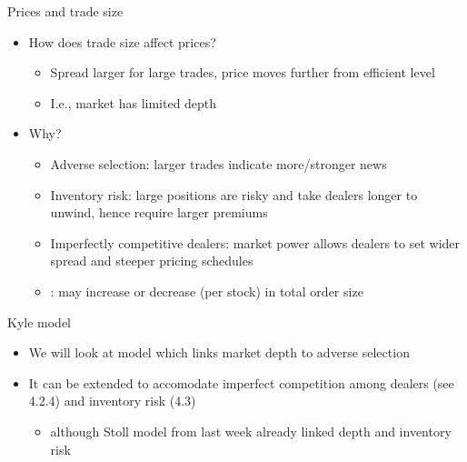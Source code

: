 \documentclass[english,10pt,aspectratio=169]{beamer}
\begin{document}
\begin{frame}{Prices and trade size}
	\begin{itemize}
		\item How does trade size affect prices? 
		\begin{itemize}
			\item Spread larger for large trades, price moves further from efficient level
			\item I.e., market has limited depth
		\end{itemize}
		\item Why?
		\pause
		\begin{itemize}
			\item \alert{Adverse selection}: larger trades indicate more/stronger news
			\item \alert{Inventory risk}: large positions are risky and take dealers longer to unwind, hence require larger premiums
			\item \alert{Imperfectly competitive dealers}: market power allows dealers to set wider spread and steeper pricing schedules
			\pause
			\item {}: may increase or decrease (per stock) in total order size
		\end{itemize}
	\end{itemize}
\end{frame}


\begin{frame}{Kyle model}
	\begin{itemize}
		\item We will look at \cite{kyle_continuous_1985} model which links market depth to adverse selection
		\item It can be extended to accomodate imperfect competition among dealers (see 4.2.4) and inventory risk (4.3)
		\begin{itemize}
			\item although Stoll model from last week already linked depth and inventory risk
		\end{itemize}
	\end{itemize}
\end{frame}
\end{document}
